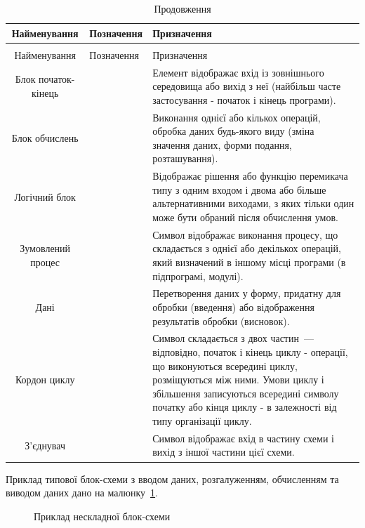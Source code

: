 \begin{longtable}[t]{|c|p{6em}|p{15em}|}

\caption{\space Основны елементи блок-схем} \label{bl-ch:table}\\
\hline

Найменування & Позначення & Призначення \\
\hline \endfirsthead
\caption*{\space Продовження} \\
\hline
Найменування & Позначення & Призначення \\
\hline \endhead
\hline \endfoot



Блок початок-кінець &   & Елемент відображає вхід із зовнішнього середовища або вихід з неї (найбільш часте застосування - початок і кінець програми). \\
\hline
Блок обчислень &  & Виконання однієї або кількох операцій, обробка даних будь-якого виду (зміна значення даних, форми подання, розташування). \\
\hline
Логічний блок &  & Відображає рішення або функцію перемикача типу з одним входом і двома або більше альтернативними виходами, з яких тільки один може бути обраний після обчислення умов. \\
\hline
Зумовлений процес &  & Символ відображає виконання процесу, що складається з однієї або декількох операцій, який визначений в іншому місці програми (в підпрограмі, модулі). \\
\hline
Дані &  & Перетворення даних у форму, придатну для обробки (введення) або відображення результатів обробки (висновок). \\
\hline
Кордон циклу &  & Символ складається з двох частин~--- відповідно, початок і кінець циклу - операції, що виконуються всередині циклу, розміщуються між ними. Умови циклу і збільшення записуються всередині символу початку або кінця циклу - в залежності від типу організації циклу. \\
\hline
З'єднувач &  & Символ відображає вхід в частину схеми і вихід з іншої частини цієї схеми.  \\
\hline
\end{longtable}

Приклад типової блок-схеми з вводом даних, розгалуженням, обчисленням та виводом даних дано на  малюнку~\ref{bl-ch:image}. 

\begin{figure}

\caption{Приклад нескладної блок-схеми}

\label{bl-ch:image}
\end{figure} 


